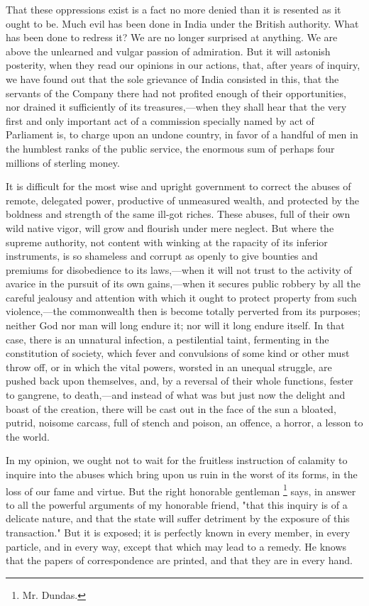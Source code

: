 That these oppressions exist is a fact no more denied than it is resented as it ought to be. Much evil has been done in India under the British authority. What has been done to redress it? We are no longer surprised at anything. We are above the unlearned and vulgar passion of admiration. But it will astonish posterity, when they read our opinions in our actions, that, after years of inquiry, we have found out that the sole grievance of India consisted in this, that the servants of the Company there had not profited enough of their opportunities, nor drained it sufficiently of its treasures,—when they shall hear that the very first and only important act of a commission specially named by act of Parliament is, to charge upon an undone country, in favor of a handful of men in the humblest ranks of the public service, the enormous sum of perhaps four millions of sterling money.

It is difficult for the most wise and upright government to correct the abuses of remote, delegated power, productive of unmeasured wealth, and protected by the boldness and strength of the same ill-got riches. These abuses, full of their own wild native vigor, will grow and flourish under mere neglect. But where the supreme authority, not content with winking at the rapacity of its inferior instruments, is so shameless and corrupt as openly to give bounties and premiums for disobedience to its laws,—when it will not trust to the activity of avarice in the pursuit of its own gains,—when it secures public robbery by all the careful jealousy and attention with which it ought to protect property from such violence,—the commonwealth then is become totally perverted from its purposes; neither God nor man will long endure it; nor will it long endure itself. In that case, there is an unnatural infection, a pestilential taint, fermenting in the constitution of society, which fever and convulsions of some kind or other must throw off, or in which the vital powers, worsted in an unequal struggle, are pushed back upon themselves, and, by a reversal of their whole functions, fester to gangrene, to death,—and instead of what was but just now the delight and boast of the creation, there will be cast out in the face of the sun a bloated, putrid, noisome carcass, full of stench and poison, an offence, a horror, a lesson to the world.

In my opinion, we ought not to wait for the fruitless instruction of calamity to inquire into the abuses which bring upon us ruin in the worst of its forms, in the loss of our fame and virtue. But the right honorable gentleman
\footnote{ Mr. Dundas.}
 says, in answer to all the powerful arguments of my honorable friend, "that this inquiry is of a delicate nature, and that the state will suffer detriment by the exposure of this transaction." But it is exposed; it is perfectly known in every member, in every particle, and in every way, except that which may lead to a remedy. He knows that the papers of correspondence are printed, and that they are in every hand.

